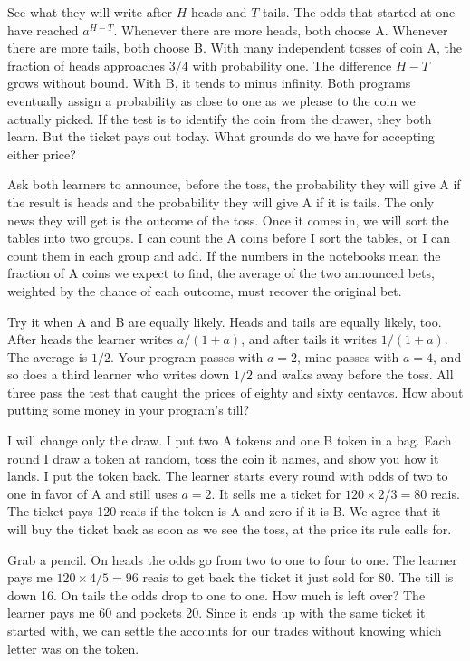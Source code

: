 See what they will write after \(H\) heads and \(T\) tails. The odds that started at one have reached \(a^{H-T}\). Whenever there are more heads, both choose A. Whenever there are more tails, both choose B. With many independent tosses of coin A, the fraction of heads approaches \(3/4\) with probability one. The difference \(H-T\) grows without bound. With B, it tends to minus infinity. Both programs eventually assign a probability as close to one as we please to the coin we actually picked. If the test is to identify the coin from the drawer, they both learn. But the ticket pays out today. What grounds do we have for accepting either price?

Ask both learners to announce, before the toss, the probability they will give A if the result is heads and the probability they will give A if it is tails. The only news they will get is the outcome of the toss. Once it comes in, we will sort the tables into two groups. I can count the A coins before I sort the tables, or I can count them in each group and add. If the numbers in the notebooks mean the fraction of A coins we expect to find, the average of the two announced bets, weighted by the chance of each outcome, must recover the original bet.

Try it when A and B are equally likely. Heads and tails are equally likely, too. After heads the learner writes $a/(1+a)$, and after tails it writes $1/(1+a)$. The average is $1/2$. Your program passes with $a=2$, mine passes with $a=4$, and so does a third learner who writes down $1/2$ and walks away before the toss. All three pass the test that caught the prices of eighty and sixty centavos. How about putting some money in your program's till?

I will change only the draw. I put two A tokens and one B token in a bag. Each round I draw a token at random, toss the coin it names, and show you how it lands. I put the token back. The learner starts every round with odds of two to one in favor of A and still uses $a=2$. It sells me a ticket for $120\times 2/3=80$ reais. The ticket pays 120 reais if the token is A and zero if it is B. We agree that it will buy the ticket back as soon as we see the toss, at the price its rule calls for.

Grab a pencil. On heads the odds go from two to one to four to one. The learner pays me $120\times 4/5=96$ reais to get back the ticket it just sold for 80. The till is down 16. On tails the odds drop to one to one. How much is left over? The learner pays me 60 and pockets 20. Since it ends up with the same ticket it started with, we can settle the accounts for our trades without knowing which letter was on the token.

